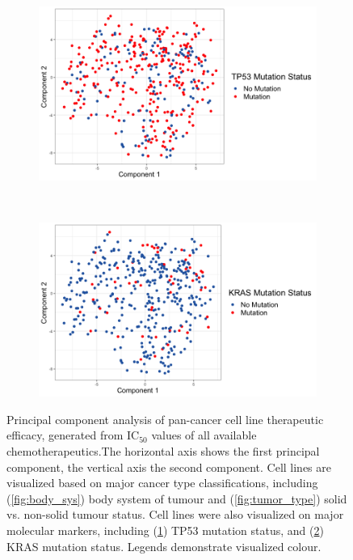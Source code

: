 \documentclass[10pt, letterpaper]{article}
\begin{document}
\begin{multicols}{2}
\begin{figure}[!ht]
	\begin{subfigure}[t]{0.5\textwidth}
		\centering
		\includegraphics[width=\columnwidth]{Figures/pca_m/tp53.png}
		\caption{}
		\label{fig:tp53}
	\end{subfigure}%
	~
	\begin{subfigure}[t]{0.5\textwidth}
		\centering
		\includegraphics[width=\columnwidth]{Figures/pca_m/kras.png}
		\caption{}
		\label{fig:kras}
	\end{subfigure}

	\caption{Principal component analysis of pan-cancer cell line therapeutic efficacy, generated from IC$_{50}$ values of all available chemotherapeutics.The horizontal axis shows the first principal component, the vertical axis the second component. Cell lines are visualized based on major cancer type classifications, including (\ref{fig:body_sys}) body system of tumour and (\ref{fig:tumor_type}) solid vs. non-solid tumour status. Cell lines were also visualized on major molecular markers, including (\ref{fig:tp53}) TP53 mutation status, and (\ref{fig:kras}) KRAS mutation status. Legends demonstrate visualized colour.}
	\label{fig:overall_pca}
\end{figure}



\end{multicols}
\end{document}
